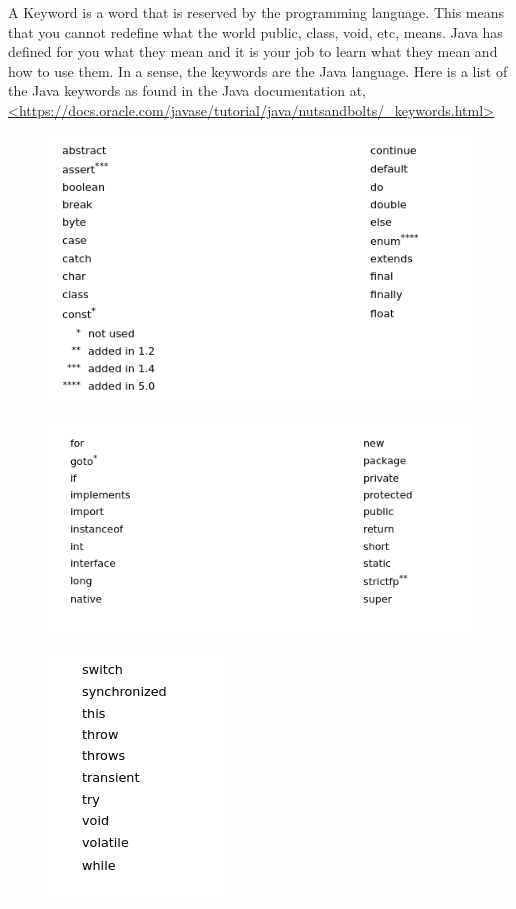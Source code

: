 \documentclass[11]{article}
\begin{document}
A Keyword is a word that is reserved by the programming language. This means that you cannot redefine what the world public, class, void, etc, means. Java has defined for you what they mean and it is your job to learn what they mean and how to use them. In a sense, the keywords are the Java language. Here is a list of the Java keywords as found in the Java documentation at, \url{<https://docs.oracle.com/javase/tutorial/java/nutsandbolts/_keywords.html>}

\begin{figure}[H]
	\centering
	\includegraphics[scale=0.5]{keywords1.png}
	\label{keywords}
\end{figure}

\begin{figure}[H]
	\centering
	\includegraphics[scale=0.5]{keywords2.png}
\end{figure}

\begin{figure}[H]
	\centering
	\includegraphics[scale=0.5]{keywords3.png}
\end{figure}
\end{document}
